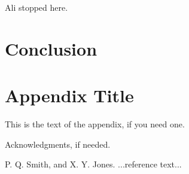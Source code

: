 \documentclass[preprint,9pt]{sigplanconf}
\begin{document}
{\sc Ali stopped here.}






\section{Conclusion}


\appendix
\section{Appendix Title}

This is the text of the appendix, if you need one.

\acks

Acknowledgments, if needed.





\begin{thebibliography}{}
\softraggedright

P. Q. Smith, and X. Y. Jones. ...reference text...

\end{thebibliography}
\end{document}
